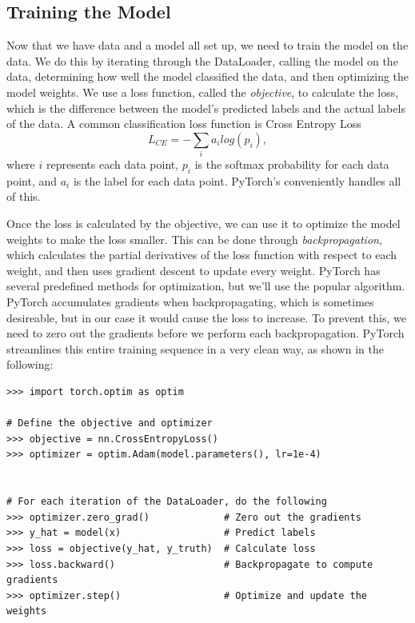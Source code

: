 \subsection*{Training the Model}
Now that we have data and a model all set up, we need to train the model on the data.
We do this by iterating through the DataLoader, calling the model on the data, determining how well the model classified the data, and then optimizing the model weights.
We use a loss function, called the \emph{objective}, to calculate the loss, which is the difference between the model's predicted labels and the actual labels of the data.
A common classification loss function is Cross Entropy Loss
\begin{equation*}
    L_{CE} = -\sum_i a_i log(p_i),
    \label{eq:cel}
\end{equation*}
where $i$ represents each data point, $p_i$ is the softmax probability for each data point, and $a_i$ is the label for each data point.
PyTorch's  conveniently handles all of this.

Once the loss is calculated by the objective, we can use it to optimize the model weights to make the loss smaller.
This can be done through \emph{backpropagation}, which calculates the partial derivatives of the loss function with respect to each weight, and then uses gradient descent to update every weight.
PyTorch has several predefined methods for optimization, but we'll use the popular  algorithm.
PyTorch accumulates gradients when backpropagating, which is sometimes desireable, but in our case it would cause the loss to increase.
To prevent this, we need to zero out the gradients before we perform each backpropagation. 
PyTorch streamlines this entire training sequence in a very clean way, as shown in the following:

\begin{lstlisting}
>>> import torch.optim as optim

# Define the objective and optimizer
>>> objective = nn.CrossEntropyLoss()
>>> optimizer = optim.Adam(model.parameters(), lr=1e-4)


# For each iteration of the DataLoader, do the following
>>> optimizer.zero_grad()             # Zero out the gradients
>>> y_hat = model(x)                  # Predict labels
>>> loss = objective(y_hat, y_truth)  # Calculate loss
>>> loss.backward()                   # Backpropagate to compute gradients
>>> optimizer.step()                  # Optimize and update the weights
\end{lstlisting}

